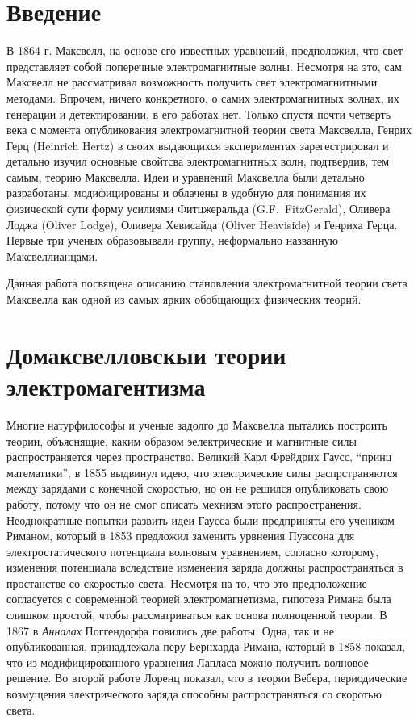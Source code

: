 \documentclass[12pt, oneside, a4paper]{article}
\begin{document}
\section*{Введение}
В 1864 г. Максвелл, на основе его известных уравнений, предположил, что свет представляет собой поперечные электромагнитные волны. Несмотря на это, сам Максвелл не рассматривал возможность получить свет электромагнитными методами. Впрочем, ничего конкретного, о самих электромагнитных волнах, их генерации и детектировании, в его работах нет. Только спустя почти четверть века с момента опубликования электромагнитной теории света Максвелла, Генрих Герц (Heinrich Hertz) в своих выдающихся  экспериментах зарегестрировал и детально изучил основные свойтсва электромагнитных волн, подтвердив, тем самым, теорию Максвелла. Идеи и уравнений  Максвелла были детально разработаны, модифицированы и облачены в удобную для понимания их физической сути форму усилиями Фитцжеральда (G.F.~FitzGerald), Оливера Лоджа (Oliver Lodge), Оливера Хевисайда (Oliver Heaviside) и Генриха Герца. Первые три ученых образовывали группу, неформально названную Максвеллианцами. 

Данная работа посвящена описанию становления электромагнитной теории света Максвелла как одной из самых ярких обобщающих физических теорий.
\section*{Домаксвелловскыи теории электромагентизма}
Многие натурфилософы и ученые задолго до Максвелла пытались построить теории, объяснящие, каким образом эелектрические и магнитные  силы распространяется через пространство. Великий Карл Фрейдрих Гаусс, ``принц математики'',  в 1855 выдвинул идею, что электрические силы распрстраняются между зарядами с конечной скоростью, но он не решился опубликовать свою работу, потому что он не смог описать мехнизм этого распространения. Неоднократные попытки развить идеи Гаусса были предприняты его учеником Риманом, который в 1853 предложил заменить урвнения Пуассона для электростатического потенциала волновым уравнением, согласно которому, изменения потенциала вследствие изменения заряда должны распространяться в простанстве со скоростью света. Несмотря на то, что это предположение согласуется с современной теорией электромагнетизма, гипотеза Римана была слишком простой, чтобы рассматриваться как основа полноценной теории. В 1867 в \emph{Анналах} Поггендорфа повились две работы. Одна, так и не опубликованная, принадлежала перу Бернхарда Римана, который в 1858 показал, что из модифицированного уравнения Лапласа можно получить волновое решение. Во второй работе Лоренц показал, что в теории Вебера, периодические возмущения электрического заряда способны распространяться со скоротью света.
\end{document}
